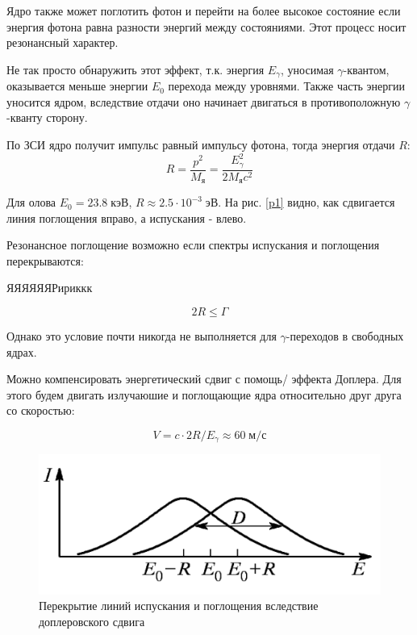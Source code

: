 \documentclass[a4paper]{article}
\begin{document}
Ядро также может поглотить фотон и перейти на более высокое состояние если энергия фотона равна разности энергий между состояниями.
Этот процесс носит резонансный характер. \par 

Не так просто обнаружить этот эффект, т.к. энергия $E_{\gamma}$, уносимая $\gamma$-квантом, оказывается меньше энергии $E_0$ перехода между уровнями.
Также часть энергии уносится ядром, вследствие отдачи оно начинает двигаться в противоположную $\gamma$-кванту сторону. \par 

По ЗСИ ядро получит импульс равный импульсу фотона, тогда энергия отдачи $R$:
\begin{equation}
    R = \frac{p^2}{M_{я}} = \frac{E_{\gamma}^2}{2 M_{я} c^2}
\end{equation}

Для олова $E_0 = 23.8\; кэВ$, $R \approx 2.5 \cdot 10^{-3} \; эВ$. На рис. \ref{p1} видно, как сдвигается 
линия поглощения вправо, а испускания - влево. 

Резонансное поглощение возможно если спектры испускания и поглощения перекрываются:

ЯЯЯЯЯЯРириккк

\begin{equation}
    2R \leq \Gamma
\end{equation}

Однако это условие почти никогда не выполняется для $\gamma$-переходов в свободных ядрах. 

Можно компенсировать энергетический сдвиг с помощь/ эффекта Доплера. Для этого будем двигать излучаюшие 
и поглощающие ядра относительно друг друга со скоростью:

\begin{equation}
    V = c \cdot 2R / E_{\gamma} \approx 60 \; м/с
\end{equation}

\begin{figure}
    \includegraphics[scale = 0.5]{p2.png}
    \caption{Перекрытие линий испускания и поглощения вследствие доплеровского сдвига}
    \label{p2}
\end{figure}
\end{document}
